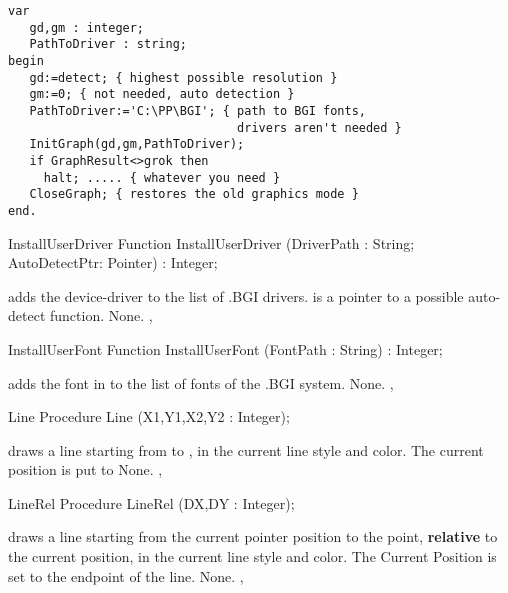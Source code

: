 \begin{verbatim}
var 
   gd,gm : integer; 
   PathToDriver : string; 
begin 
   gd:=detect; { highest possible resolution } 
   gm:=0; { not needed, auto detection } 
   PathToDriver:='C:\PP\BGI'; { path to BGI fonts, 
                                drivers aren't needed } 
   InitGraph(gd,gm,PathToDriver); 
   if GraphResult<>grok then 
     halt; ..... { whatever you need } 
   CloseGraph; { restores the old graphics mode } 
end.
\end{verbatim}

\begin{function}{InstallUserDriver}
\Declaration
Function InstallUserDriver (DriverPath : String; \\AutoDetectPtr: Pointer) : Integer;

\Description
{} 
adds the device-driver  to the list of .BGI
drivers.  is a pointer to a possible auto-detect function.
\Errors
None.
\SeeAlso
{}, 
\end{function}

\begin{function}{InstallUserFont}
\Declaration
Function InstallUserFont (FontPath : String) : Integer;

\Description
{} adds the font in  to the list of fonts
of the .BGI system.
\Errors
None.
\SeeAlso
{}, 
\end{function}

\begin{procedure}{Line}
\Declaration
Procedure Line (X1,Y1,X2,Y2 : Integer);

\Description
{} draws a line starting from
 to , in the current line style and color. The
current position is put to 
\Errors
None.
\SeeAlso
{},
\end{procedure}

\begin{procedure}{LineRel}
\Declaration
Procedure LineRel (DX,DY : Integer);

\Description
{} draws a line starting from
the current pointer position to the point, \textbf{relative} to the
current position, in the current line style and color. The Current Position
is set to the endpoint of the line.
\Errors
None.
\SeeAlso
{}, 
\end{procedure}

